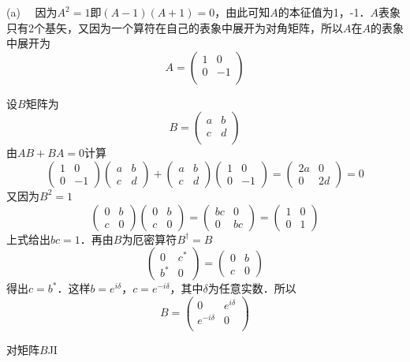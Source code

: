(a) \ \ 因为$A^2=1$即$(A-1)(A+1)=0$，由此可知$A$的本征值为1，-1．$A$表象只有2个基矢，又因为一个算符在自己的表象中展开为对角矩阵，所以$A$在$A$的表象中展开为
$$
A=\left( \begin{matrix}
	1&		0\\
	0&		-1\\
\end{matrix} \right) 
$$

设$B$矩阵为
$$
B=\left( \begin{matrix}
	a&		b\\
	c&		d\\
\end{matrix} \right) 
$$
由$AB+BA=0$计算
$$
\left(\begin{array}{cc}
1 & 0 \\
0 & -1
\end{array}\right)\left(\begin{array}{ll}
a & b \\
c & d
\end{array}\right)+\left(\begin{array}{ll}
a & b \\
c & d
\end{array}\right)\left(\begin{array}{cc}
1 & 0 \\
0 & -1
\end{array}\right)=\left(\begin{array}{cc}
2 a & 0 \\
0 & 2 d
\end{array}\right)=0
$$
又因为$B^2=1$
$$
\left(\begin{array}{ll}
0 & b \\
c & 0
\end{array}\right)\left(\begin{array}{ll}
0 & b \\
c & 0
\end{array}\right)=\left(\begin{array}{ll}
b c & 0 \\
0 & b c
\end{array}\right)=\left(\begin{array}{ll}
1 & 0 \\
0 & 1
\end{array}\right)$$
上式给出$bc=1$．再由$B$为厄密算符$B^\dagger=B$
$$
\left(\begin{array}{ll}
0 & c^* \\
b^* & 0
\end{array}\right)=\left(\begin{array}{ll}
0 & b \\
c & 0
\end{array}\right)
$$
得出$c=b^*$．这样$b=e^{i\delta}$，$c=e^{-i\delta}$，其中$\delta$为任意实数．所以
$$
B=\left( \begin{matrix}
	0&		e^{i\delta}\\
	e^{-i\delta}&		0\\
\end{matrix} \right) 
$$

对矩阵$B$JI